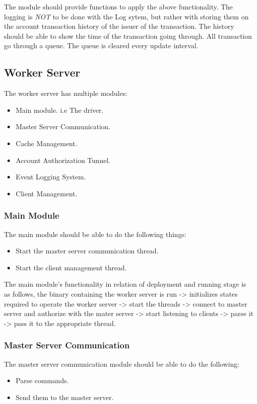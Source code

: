 \documentclass[a4paper]{article}
\begin{document}
The module should provide functions to apply the above functionality. The
logging is \emph{NOT} to be done with the Log sytem, but rather with storing
them on the account transaction history of the issuer of the transaction. The 
history should be able to show the time of the transaction going through. All 
transaction go through a queue. The queue is cleared every update interval.

\subsection{Worker Server}
The worker server has multiple modules:
\begin{itemize}
	\item Main module. i.e The driver.
	\item Master Server Communication.
	\item Cache Management.
	\item Account Authorization Tunnel.
	\item Event Logging System.
	\item Client Management.
\end{itemize}

\subsubsection{Main Module}
The main module should be able to do the following things:
\begin{itemize}
	\item Start the master server communication thread.
	\item Start the client management thread.
\end{itemize}

The main module's functionality in relation of deployment and running stage is 
as follows, the binary containing the worker server is run -> initializes
states required to operate the worker server -> start the threads -> connect to
master server and authorize with the mater server -> start listening to clients
-> parse it -> pass it to the appropriate thread.

\subsubsection{Master Server Communication}
\label{worker_master_comms}
The master server communication module should be able to do the following:
\begin{itemize}
	\item Parse commands.
	\item Send them to the master server.
\end{itemize}
\end{document}
